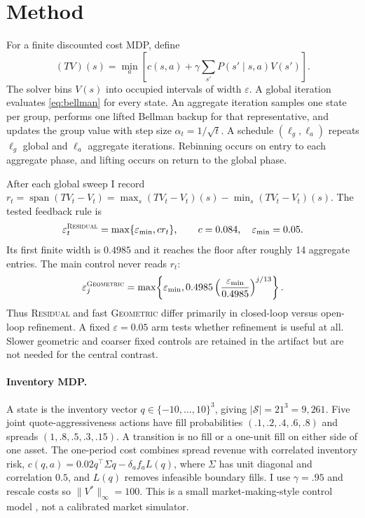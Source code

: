 \documentclass{article}
\newcommand{\R}{\textsc{Residual}}
\newcommand{\G}{\textsc{Geometric}}
\begin{document}
\section{Method}

For a finite discounted cost MDP, define
\begin{equation}
 (TV)(s)=\min_a\left[c(s,a)+\gamma\sum_{s'}P(s'\mid s,a)V(s')\right].
 \label{eq:bellman}
\end{equation}
The solver bins $V(s)$ into occupied intervals of width $\varepsilon$.  A
global iteration evaluates \eqref{eq:bellman} for every state.  An aggregate
iteration samples one state per group, performs one lifted Bellman backup for
that representative, and updates the group value with step size
$\alpha_t=1/\sqrt{t}$.  A schedule $(\ell_g,\ell_a)$ repeats $\ell_g$ global
and $\ell_a$ aggregate iterations.  Rebinning occurs on entry to each aggregate
phase, and lifting occurs on return to the global phase.

After each global sweep I record
$r_t=\operatorname{span}(TV_t-V_t)=\max_s(TV_t-V_t)(s)-
\min_s(TV_t-V_t)(s)$.  The tested feedback rule is
\begin{equation}
 \varepsilon_t^{\R}=\max\{\varepsilon_{\min},c r_t\},
 \qquad c=0.084,\quad \varepsilon_{\min}=0.05.
 \label{eq:residual}
\end{equation}
Its first finite width is $0.4985$ and it reaches the floor after roughly
14 aggregate entries.  The main control never reads $r_t$:
\begin{equation}
 \varepsilon_j^{\G}=\max\!\left\{\varepsilon_{\min},
 0.4985\left(\frac{\varepsilon_{\min}}{0.4985}\right)^{j/13}\right\}.
 \label{eq:geometric}
\end{equation}
Thus \R{} and fast \G{} differ primarily in closed-loop versus open-loop
refinement.  A fixed $\varepsilon=0.05$ arm tests whether refinement is useful
at all.  Slower geometric and coarser fixed controls are retained in the
artifact but are not needed for the central contrast.

\paragraph{Inventory MDP.}
A state is the inventory vector $q\in\{-10,\ldots,10\}^3$, giving
$|\mathcal S|=21^3=9{,}261$.  Five joint quote-aggressiveness actions have fill
probabilities $(.1,.2,.4,.6,.8)$ and spreads $(1,.8,.5,.3,.15)$.  A transition
is no fill or a one-unit fill on either side of one asset.  The one-period cost
combines spread revenue with correlated inventory risk,
$c(q,a)=0.02q^\top\Sigma q-\delta_a f_a L(q)$, where $\Sigma$ has unit diagonal
and correlation $0.5$, and $L(q)$ removes infeasible boundary fills.  I use
$\gamma=.95$ and rescale costs so $\lVert V^*\rVert_\infty=100$.  This is a
small market-making-style control model \citep{avellaneda2008,gueant2017}, not a
calibrated market simulator.
\end{document}
